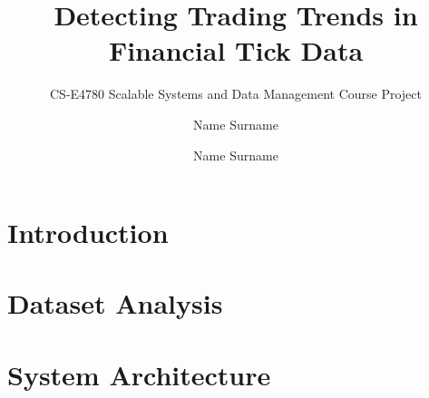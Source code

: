 \documentclass[sigconf,nonacm]{acmart}
\title{Detecting Trading Trends in Financial Tick Data}
\subtitle{CS-E4780 Scalable Systems and Data Management Course Project}
\author{Name Surname}
\affiliation{\institution{Aalto University}\city{Espoo}\country{Finland}}
\author{Name Surname}
\affiliation{\institution{Aalto University}\city{Espoo}\country{Finland}}
\begin{document}
\begin{abstract}
\end{abstract}

\maketitle

\section{Introduction}

\section{Dataset Analysis}

\section{System Architecture}
\end{document}
